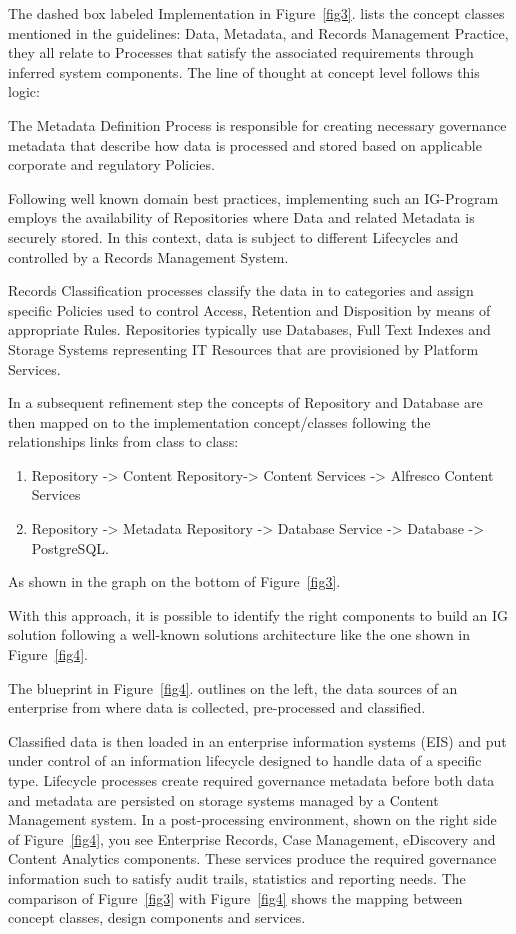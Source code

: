 \documentclass[runningheads]{llncs}
\begin{document}
The dashed box labeled Implementation in Figure~\ref{fig3}. lists the concept classes mentioned in the guidelines: Data, Metadata, and Records Management Practice, they all relate to Processes that satisfy the associated requirements through inferred system components. The line of thought at concept level follows this logic: 

The Metadata Definition Process is responsible for creating necessary governance metadata that describe how data is processed and stored based on applicable corporate and regulatory Policies. 

Following well known domain best practices, implementing such an IG-Program employs the availability of Repositories where Data and related Metadata is securely stored. 
In this context, data is subject to different Lifecycles and controlled by a Records Management System. 

Records Classification processes classify the data in to categories and assign specific Policies used to control Access, Retention and Disposition by means of appropriate Rules. Repositories typically use Databases, Full Text Indexes and Storage Systems representing IT Resources that are provisioned by Platform Services. 

 In a subsequent refinement step the concepts of Repository and Database are then mapped on to the implementation concept/classes following the relationships links from class to class:
 \begin{enumerate}
     \item Repository -> Content Repository-> Content Services -> Alfresco Content Services 
     \item Repository -> Metadata Repository -> Database Service -> Database -> PostgreSQL. 
 \end{enumerate}
As shown in the graph on the bottom of Figure~\ref{fig3}.

With this approach, it is possible to identify the right components to build an IG solution following a well-known solutions architecture like the one shown in Figure~\ref{fig4}. 

The blueprint in Figure~\ref{fig4}. outlines on the left, the data sources of an enterprise from where data is collected, pre-processed and classified. 

Classified data is then loaded in an enterprise information systems (EIS) and put under control of an information lifecycle designed to handle data of a specific type. Lifecycle processes create required governance metadata before both data and metadata are persisted on storage systems managed by a Content Management system. In a post-processing environment, shown on the right side of Figure~\ref{fig4}, you see Enterprise Records, Case Management, eDiscovery and Content Analytics components.  These services produce the required governance information such to satisfy audit trails, statistics and reporting needs. The comparison of Figure~\ref{fig3} with Figure~\ref{fig4} shows the mapping between concept classes, design components and services. 
\end{document}
